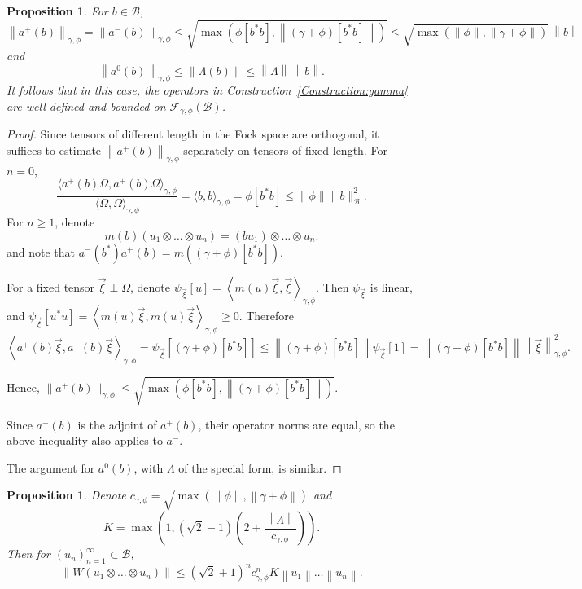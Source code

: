 \documentclass[12pt]{amsart}
\newtheorem{Prop}[Thm]{Proposition}
\theoremstyle{definition}
\newcommand{\mc}[1]{\mathcal{#1}}
\newcommand{\ip}[2]{\left \langle{#1},{#2} \right \rangle}
\newcommand{\norm}[1]{\left \|{#1} \right \|}
\begin{document}
\begin{Prop}\label{Prop:Estimates}
For $b \in \mc{B}$,
\[
\norm{a^+(b)}_{\gamma, \phi} = \norm{a^-(b)}_{\gamma, \phi} \leq \sqrt{\max(\phi[b^\ast b], \norm{(\gamma + \phi)[ b^\ast b]})} \leq \sqrt{\max(\norm{\phi}, \norm{\gamma + \phi})} \ \norm{b}\]
and
\[
\norm{a^0(b)}_{\gamma, \phi} \leq \norm{\Lambda(b)} \leq \norm{\Lambda} \ \norm{b}.
\]
It follows that in this case, the operators in Construction~\ref{Construction:gamma} are well-defined and bounded on $\mc{F}_{\gamma, \phi}(\mc{B})$.
\end{Prop}


\begin{proof}
Since tensors of different length in the Fock space are orthogonal, it suffices to estimate $\norm{a^+(b)}_{\gamma, \phi}$ separately on tensors of fixed length.	For $n=0$,
	\begin{equation*}
	\frac{\langle a^+(b)\Omega,a^+(b)\Omega\rangle_{\gamma,\phi}}{\langle \Omega ,\Omega\rangle_{\gamma,\phi}}
= \langle b ,b\rangle_{\gamma,\phi}
= \phi[b^\ast b] \leq \|\phi\|\|b\|_{\mathcal{B}}^2.
	\end{equation*}
For $n \geq 1$, denote
\[
m(b) (u_1 \otimes \ldots \otimes u_n) = (b u_1) \otimes \ldots \otimes u_n.
\]
and note that $a^-(b^\ast) a^+(b) = m((\gamma + \phi)[b^\ast b])$.

For a fixed tensor $\vec{\xi} \perp \Omega$, denote $\psi_{\vec{\xi}}[u] = \ip{m(u) \vec{\xi}}{\vec{\xi}}_{\gamma, \phi}$. Then $\psi_{\vec{\xi}}$ is linear, and $\psi_{\vec{\xi}}[u^\ast u] = \ip{m(u) \vec{\xi}}{m(u) \vec{\xi}}_{\gamma, \phi} \geq 0$. Therefore
\[
\ip{a^+(b) \vec{\xi}}{a^+(b) \vec{\xi}}_{\gamma, \phi}
= \psi_{\vec{\xi}}[(\gamma + \phi)[b^\ast b]]
\leq \norm{(\gamma + \phi)[b^\ast b]} \psi_{\vec{\xi}}[1]
= \norm{(\gamma + \phi)[b^\ast b]} \norm{\vec{\xi}}_{\gamma, \phi}^2.
\]


	Hence, $\|a^+(b)\|_{\gamma, \phi} \leq \sqrt{\max(\phi[b^\ast b], \norm{(\gamma + \phi)[ b^\ast b]})}$.
	
	Since $a^-(b)$ is the adjoint of $a^+(b)$, their operator norms are equal, so the above inequality also applies to $a^-$.
	
The argument for $a^0(b)$, with $\Lambda$ of the special form, is similar.
\end{proof}


\begin{Prop}\label{Prop:WNorms}
	Denote $c_{\gamma, \phi} = \sqrt{\max(\norm{\phi}, \norm{\gamma + \phi})}$ and
\[
K = \max \left(1, (\sqrt{2} - 1) \left(2 + \frac{\norm{\Lambda}}{c_{\gamma, \phi}} \right) \right).
\]
Then for $(u_n)_{n=1}^\infty \subset \mc{B}$,
	\[
	\norm{W(u_1 \otimes \ldots \otimes u_n)} \leq (\sqrt{2} + 1)^n c_{\gamma, \phi}^n K \norm{u_1} \ldots \norm{u_n}.
	\]
\end{Prop}
\end{document}
